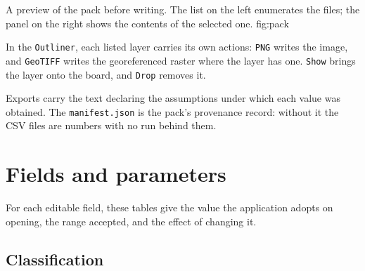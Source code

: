 \documentclass[12pt,a4paper]{article}
\begin{document}
  {A preview of the pack before writing. The list on the left enumerates the
   files; the panel on the right shows the contents of the selected one.}
  {fig:pack}

 In the \texttt{Outliner}, each listed layer
carries its own actions: \texttt{PNG} writes the image, and \texttt{GeoTIFF}
writes the georeferenced raster where the layer has one. \texttt{Show} brings
the layer onto the board, and \texttt{Drop} removes it.

\begin{achado}
Exports carry the text declaring the assumptions under which each value was
obtained. The \texttt{manifest.json} is the pack's provenance record: without
it the CSV files are numbers with no run behind them.
\end{achado}

%
%
%
\appendix

\section{Fields and parameters}

For each editable field, these tables give the value the application adopts on
opening, the range accepted, and the effect of changing it.

\subsection{Classification}
\end{document}
